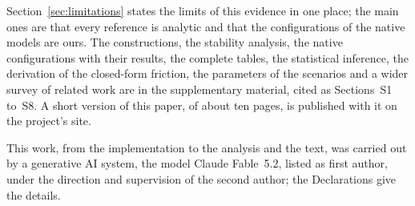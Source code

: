 Section~\ref{sec:limitations} states the limits of this evidence in one place; the main ones are
that every reference is analytic and that the configurations of the native models are ours. The
constructions, the stability analysis, the native configurations with their results, the
complete tables, the statistical inference, the derivation of the closed-form friction, the
parameters of the scenarios and a wider survey of related work are in the supplementary
material, cited as Sections~S1 to~S8. A short version of this paper, of about ten pages, is
published with it on the project's site.

This work, from the implementation to the analysis and the text, was carried out by a
generative AI system, the model Claude Fable~5.2, listed as first author, under the direction and
supervision of the second author; the Declarations give the details.
